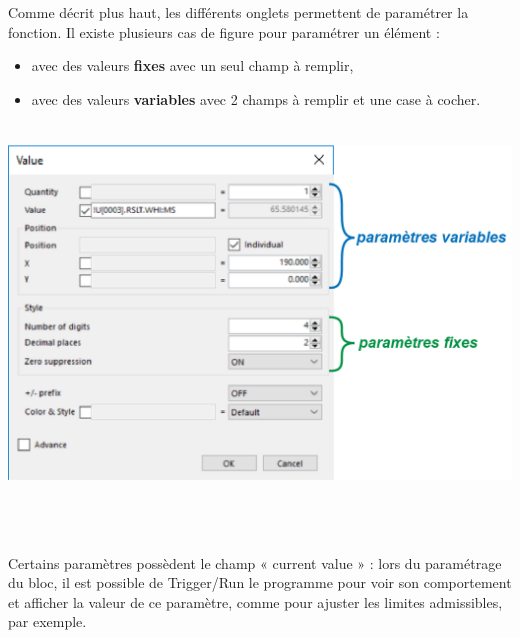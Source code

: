 Comme décrit plus haut, les différents onglets permettent de paramétrer la fonction. 
Il existe plusieurs cas de figure pour paramétrer un élément :
\begin{itemize}
  \item avec des valeurs \textbf{fixes} avec un seul champ à remplir,
  \item avec des valeurs \textbf{variables} avec 2 champs à remplir et une case à
  cocher.
\end{itemize}
\vspace{0.3cm}

\noindent
\begin{minipage}[c]{\textwidth}
  \centering
  \includegraphics[width=16cm, height=10cm, keepaspectratio]{addOns/LaboCalib_Function_ParametersTypes.png}
  \label{fig.Functions_ParametersType}
\end{minipage}\\
\vspace{0.3cm}

Certains paramètres possèdent le champ « current value » : lors du paramétrage du bloc, il est possible de Trigger/Run le programme pour voir son comportement et afficher la valeur de ce paramètre, comme pour ajuster les limites admissibles, par exemple.

